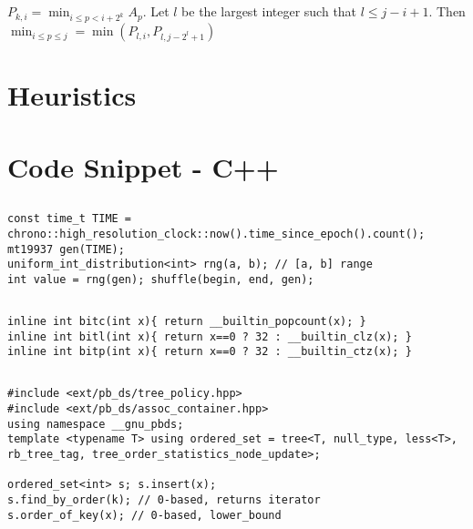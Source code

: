 \documentclass[landscape, 8pt, a4paper, oneside, twocolumn]{extarticle}
\begin{document}
\subsection{}
$P_{k,i} = \min_{i \le p < i+2^{k}} A_p$.
Let $l$ be the largest integer such that $l \le j-i+1$. Then $\min_{i \le p \le j} = \min(P_{l,i}, P_{l,j-2^{l}+1})$
\section{Heuristics}
\subsection{}
\subsection{}
\section{Code Snippet - C++}
\subsection{}
\begin{verbatim}
const time_t TIME = chrono::high_resolution_clock::now().time_since_epoch().count();
mt19937 gen(TIME);
uniform_int_distribution<int> rng(a, b); // [a, b] range
int value = rng(gen); shuffle(begin, end, gen);
\end{verbatim}
\subsection{}
\begin{verbatim}
inline int bitc(int x){ return __builtin_popcount(x); }
inline int bitl(int x){ return x==0 ? 32 : __builtin_clz(x); }
inline int bitp(int x){ return x==0 ? 32 : __builtin_ctz(x); }
\end{verbatim}
\subsection{}
\begin{verbatim}
#include <ext/pb_ds/tree_policy.hpp>
#include <ext/pb_ds/assoc_container.hpp>
using namespace __gnu_pbds;
template <typename T> using ordered_set = tree<T, null_type, less<T>, rb_tree_tag, tree_order_statistics_node_update>;

ordered_set<int> s; s.insert(x);
s.find_by_order(k); // 0-based, returns iterator
s.order_of_key(x); // 0-based, lower_bound
\end{verbatim}
\end{document}
